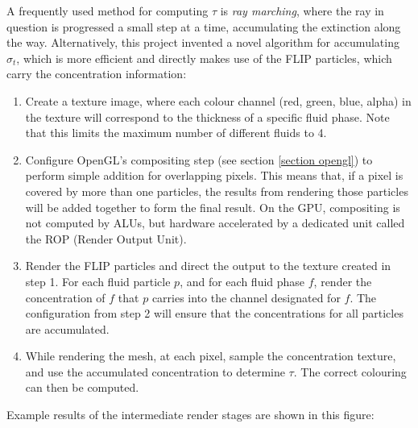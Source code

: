 A frequently used method for computing $\tau$ is \textit{ray marching}, where the ray in question is progressed a small step at a time, accumulating the extinction along the way. Alternatively, this project invented a novel algorithm for accumulating $\sigma_t$, which is more efficient and directly makes use of the FLIP particles, which carry the concentration information:
\begin{enumerate}
    \item 
    Create a texture image, where each colour channel (red, green, blue, alpha) in the texture will correspond to the thickness of a specific fluid phase. Note that this limits the maximum number of different fluids to 4.

    \item 
    Configure OpenGL's compositing step (see section \ref{section opengl}) to perform simple addition for overlapping pixels. This means that, if a pixel is covered by more than one particles, the results from rendering those particles will be added together to form the final result. On the GPU, compositing is not computed by ALUs, but hardware accelerated by a dedicated unit called the ROP (Render Output Unit).

    \item 
    Render the FLIP particles and direct the output to the texture created in step 1. For each fluid particle $p$, and for each fluid phase $f$, render the concentration of $f$ that $p$ carries into the channel designated for $f$. The configuration from step 2 will ensure that the concentrations for all particles are accumulated.

    \item 
    While rendering the mesh, at each pixel, sample the concentration texture, and use the accumulated concentration to determine $\tau$. The correct colouring can then be computed.
    
\end{enumerate}
Example results of the intermediate render stages are shown in this figure:





\newpage
\thispagestyle{empty}
    

\addtolength{\topmargin}{-.875in}

